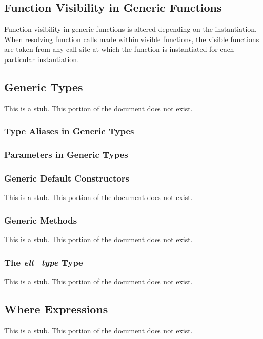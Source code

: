 \subsection{Function Visibility in Generic Functions}
\label{Function_Visibility_in_Generic_Functions}

Function visibility in generic functions is altered depending on the
instantiation.  When resolving function calls made within visible
functions, the visible functions are taken from any call site at which
the function is instantiated for each particular instantiation.

\subsection{Generic Types}
\label{Generic_Types}

This is a stub.  This portion of the document does not exist.

\subsubsection{Type Aliases in Generic Types}
\label{Type_Aliases_in_Generic_Types}

\subsubsection{Parameters in Generic Types}
\label{Parameters_in_Generic_Types}

\subsubsection{Generic Default Constructors}
\label{Generic_Default_Constructors}

This is a stub.  This portion of the document does not exist.

\subsubsection{Generic Methods}
\label{Generic_Methods}

This is a stub.  This portion of the document does not exist.

\subsubsection{The {\em elt\_type} Type}
\label{The_em_elt_type_Type}

This is a stub.  This portion of the document does not exist.

\subsection{Where Expressions}
\label{Where_Expressions}

This is a stub.  This portion of the document does not exist.
